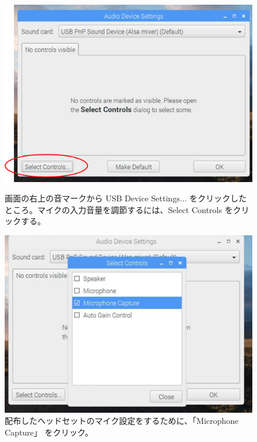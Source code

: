 \begin{figure}[H]
\begin{minipage}[t]{0.3\linewidth}
\begin{center}
    \includegraphics[width=\linewidth]{images/chap06/text06-img006.png}
    \caption{画面の右上の音マークから USB Device Settings... をクリックしたところ。マイクの入力音量を調節するには、Select Controls をクリックする。}
    \label{音量変更1}
\end{center}
\end{minipage}
\begin{minipage}[t]{0.3\linewidth}
\begin{center}
    \includegraphics[width=\linewidth]{images/chap06/text06-img007.png}
    \caption{配布したヘッドセットのマイク設定をするために、「Microphone Capture」 をクリック。}

\end{center}
\end{minipage}
\end{figure}
